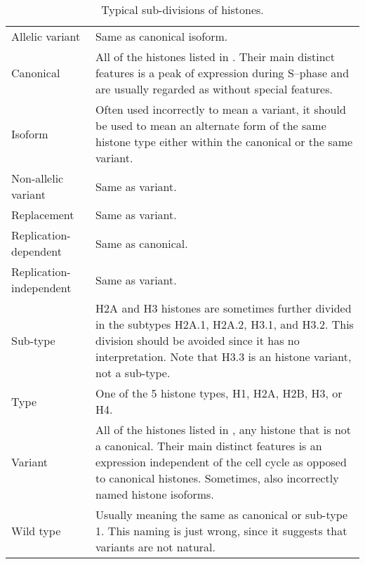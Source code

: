   \begin{table*}
    \caption{Typical sub-divisions of histones.}
    \label{tab:histone-divisions}
    \centering
    \begin{tabular}{F p{\dimexpr(\textwidth--4\tabcolsep)}}
      \toprule
      Allelic variant & Same as canonical isoform. \\
      Canonical &   All of the histones listed in .
                    Their main distinct features is a peak of expression during
                    S--phase and are usually regarded as without special
                    features. \\
      \addlinespace
      Isoform   &   Often used incorrectly to mean a variant, it should be
                    used to mean an alternate form of the same histone type
                    either within the canonical or the same variant. \\
      \addlinespace
      Non-allelic variant & Same as variant. \\
      \addlinespace
      Replacement & Same as variant. \\
      \addlinespace
      Replication-dependent & Same as canonical. \\
      \addlinespace
      Replication-independent & Same as variant. \\
      \addlinespace
      Sub-type  &   H2A and H3 histones are sometimes further divided in the
                    subtypes H2A.1, H2A.2, H3.1, and H3.2. This division should
                    be avoided since it has no interpretation. Note that H3.3
                    is an histone variant, not a sub-type. \\
      \addlinespace
      Type      &   One of the 5 histone types, H1, H2A, H2B, H3, or H4.\\
      \addlinespace
      Variant   &   All of the histones listed in ,
                    any histone that is not a canonical. Their main distinct
                    features is an expression independent of the cell cycle as
                    opposed to canonical histones. Sometimes, also incorrectly
                    named histone isoforms. \\
      \addlinespace
      Wild type &   Usually meaning the same as canonical or sub-type 1. This
                    naming is just wrong, since it suggests that variants are
                    not natural. \\
      \bottomrule
    \end{tabular}
  \end{table*}

